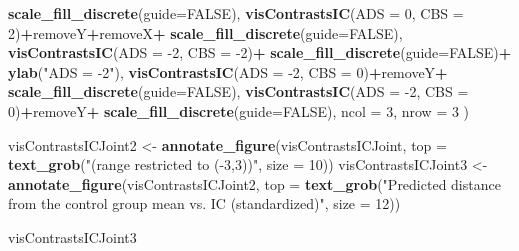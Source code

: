 \documentclass[10pt,dvipsnames,enabledeprecatedfontcommands]{scrartcl}
\newenvironment{Shaded}{\begin{snugshade}}{\end{snugshade}}
\newcommand{\KeywordTok}[1]{\textcolor[rgb]{0.13,0.29,0.53}{\textbf{#1}}}
\newcommand{\DataTypeTok}[1]{\textcolor[rgb]{0.13,0.29,0.53}{#1}}
\newcommand{\DecValTok}[1]{\textcolor[rgb]{0.00,0.00,0.81}{#1}}
\newcommand{\StringTok}[1]{\textcolor[rgb]{0.31,0.60,0.02}{#1}}
\newcommand{\OtherTok}[1]{\textcolor[rgb]{0.56,0.35,0.01}{#1}}
\newcommand{\OperatorTok}[1]{\textcolor[rgb]{0.81,0.36,0.00}{\textbf{#1}}}
\newcommand{\NormalTok}[1]{#1}
\begin{document}
\begin{Shaded}
\begin{Highlighting}[]
\StringTok{  }\KeywordTok{scale_fill_discrete}\NormalTok{(}\DataTypeTok{guide=}\OtherTok{FALSE}\NormalTok{),}
    \KeywordTok{visContrastsIC}\NormalTok{(}\DataTypeTok{ADS =} \DecValTok{0}\NormalTok{, }\DataTypeTok{CBS =} \DecValTok{2}\NormalTok{)}\OperatorTok{+}\NormalTok{removeY}\OperatorTok{+}\NormalTok{removeX}\OperatorTok{+}\StringTok{ }\KeywordTok{scale_fill_discrete}\NormalTok{(}\DataTypeTok{guide=}\OtherTok{FALSE}\NormalTok{),  }
\KeywordTok{visContrastsIC}\NormalTok{(}\DataTypeTok{ADS =} \DecValTok{-2}\NormalTok{, }\DataTypeTok{CBS =} \DecValTok{-2}\NormalTok{)}\OperatorTok{+}\StringTok{ }\KeywordTok{scale_fill_discrete}\NormalTok{(}\DataTypeTok{guide=}\OtherTok{FALSE}\NormalTok{)}\OperatorTok{+}
\StringTok{  }\KeywordTok{ylab}\NormalTok{(}\StringTok{"ADS = -2"}\NormalTok{),}
    \KeywordTok{visContrastsIC}\NormalTok{(}\DataTypeTok{ADS =} \DecValTok{-2}\NormalTok{, }\DataTypeTok{CBS =} \DecValTok{0}\NormalTok{)}\OperatorTok{+}\NormalTok{removeY}\OperatorTok{+}\StringTok{ }\KeywordTok{scale_fill_discrete}\NormalTok{(}\DataTypeTok{guide=}\OtherTok{FALSE}\NormalTok{),}
    \KeywordTok{visContrastsIC}\NormalTok{(}\DataTypeTok{ADS =} \DecValTok{-2}\NormalTok{, }\DataTypeTok{CBS =} \DecValTok{0}\NormalTok{)}\OperatorTok{+}\NormalTok{removeY}\OperatorTok{+}\StringTok{ }\KeywordTok{scale_fill_discrete}\NormalTok{(}\DataTypeTok{guide=}\OtherTok{FALSE}\NormalTok{), }
\DataTypeTok{ncol =} \DecValTok{3}\NormalTok{, }\DataTypeTok{nrow =} \DecValTok{3}
\NormalTok{)}

\NormalTok{visContrastsICJoint2 <-}\StringTok{ }\KeywordTok{annotate_figure}\NormalTok{(visContrastsICJoint, }
\DataTypeTok{top =} \KeywordTok{text_grob}\NormalTok{(}\StringTok{"(range restricted to (-3,3))"}\NormalTok{, }
                \DataTypeTok{size =} \DecValTok{10}\NormalTok{))}
\NormalTok{visContrastsICJoint3 <-}\StringTok{ }\KeywordTok{annotate_figure}\NormalTok{(visContrastsICJoint2, }
 \DataTypeTok{top =} \KeywordTok{text_grob}\NormalTok{(}\StringTok{"Predicted distance from the control group mean vs. IC (standardized)"}\NormalTok{,}
                \DataTypeTok{size =} \DecValTok{12}\NormalTok{))}

\NormalTok{visContrastsICJoint3}
\end{Highlighting}
\end{Shaded}
\end{document}

